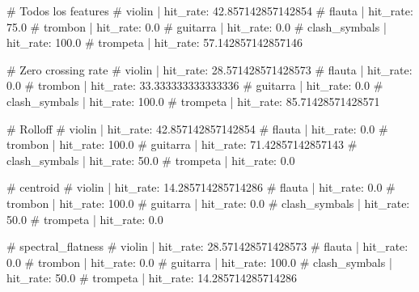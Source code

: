 # Todos los features
	# violin | hit_rate: 42.857142857142854
	# flauta | hit_rate: 75.0
	# trombon | hit_rate: 0.0
	# guitarra | hit_rate: 0.0
	# clash_symbals | hit_rate: 100.0
	# trompeta | hit_rate: 57.142857142857146

# Zero crossing rate
	# violin | hit_rate: 28.571428571428573
	# flauta | hit_rate: 0.0
	# trombon | hit_rate: 33.333333333333336
	# guitarra | hit_rate: 0.0
	# clash_symbals | hit_rate: 100.0
	# trompeta | hit_rate: 85.71428571428571

# Rolloff
	# violin | hit_rate: 42.857142857142854
	# flauta | hit_rate: 0.0
	# trombon | hit_rate: 100.0
	# guitarra | hit_rate: 71.42857142857143
	# clash_symbals | hit_rate: 50.0
	# trompeta | hit_rate: 0.0

# centroid
	# violin | hit_rate: 14.285714285714286
	# flauta | hit_rate: 0.0
	# trombon | hit_rate: 100.0
	# guitarra | hit_rate: 0.0
	# clash_symbals | hit_rate: 50.0
	# trompeta | hit_rate: 0.0

# spectral_flatness
	# violin | hit_rate: 28.571428571428573
	# flauta | hit_rate: 0.0
	# trombon | hit_rate: 0.0
	# guitarra | hit_rate: 100.0
	# clash_symbals | hit_rate: 50.0
	# trompeta | hit_rate: 14.285714285714286
